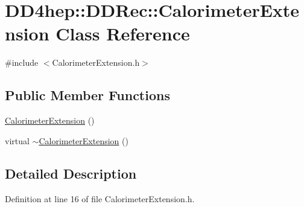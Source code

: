 \hypertarget{class_d_d4hep_1_1_d_d_rec_1_1_calorimeter_extension}{
\section{DD4hep::DDRec::CalorimeterExtension Class Reference}
\label{class_d_d4hep_1_1_d_d_rec_1_1_calorimeter_extension}
}


{\ttfamily \#include $<$CalorimeterExtension.h$>$}\subsection*{Public Member Functions}
\begin{DoxyCompactItemize}
\item 
\hyperlink{class_d_d4hep_1_1_d_d_rec_1_1_calorimeter_extension_a825366de862b94c746fe49432591406b}{CalorimeterExtension} ()
\item 
virtual \hyperlink{class_d_d4hep_1_1_d_d_rec_1_1_calorimeter_extension_a387851f2812749225010c8e3d174724f}{$\sim$CalorimeterExtension} ()
\end{DoxyCompactItemize}


\subsection{Detailed Description}


Definition at line 16 of file CalorimeterExtension.h.

